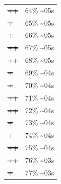 \documentclass[12pt]{article}
\begin{document}
\begin{center}
\begin{tabular}{ll}
\sout{\sout{\sout{\sout{\sout{\sout{\sout{\sout{\sout{\sout{\sout{\sout{\sout{\sout{\sout{++}}}}}}}}}}}}}}} & 64\% \textasciitilde{}05s\\
\sout{\sout{\sout{\sout{\sout{\sout{\sout{\sout{\sout{\sout{\sout{\sout{\sout{\sout{\sout{\sout{+}}}}}}}}}}}}}}}} & 65\% \textasciitilde{}05s\\
\sout{\sout{\sout{\sout{\sout{\sout{\sout{\sout{\sout{\sout{\sout{\sout{\sout{\sout{\sout{\sout{+}}}}}}}}}}}}}}}} & 66\% \textasciitilde{}05s\\
\sout{\sout{\sout{\sout{\sout{\sout{\sout{\sout{\sout{\sout{\sout{\sout{\sout{\sout{\sout{\sout{++}}}}}}}}}}}}}}}} & 67\% \textasciitilde{}05s\\
\sout{\sout{\sout{\sout{\sout{\sout{\sout{\sout{\sout{\sout{\sout{\sout{\sout{\sout{\sout{\sout{++}}}}}}}}}}}}}}}} & 68\% \textasciitilde{}05s\\
\sout{\sout{\sout{\sout{\sout{\sout{\sout{\sout{\sout{\sout{\sout{\sout{\sout{\sout{\sout{\sout{\sout{+}}}}}}}}}}}}}}}}} & 69\% \textasciitilde{}04s\\
\sout{\sout{\sout{\sout{\sout{\sout{\sout{\sout{\sout{\sout{\sout{\sout{\sout{\sout{\sout{\sout{\sout{+}}}}}}}}}}}}}}}}} & 70\% \textasciitilde{}04s\\
\sout{\sout{\sout{\sout{\sout{\sout{\sout{\sout{\sout{\sout{\sout{\sout{\sout{\sout{\sout{\sout{\sout{++}}}}}}}}}}}}}}}}} & 71\% \textasciitilde{}04s\\
\sout{\sout{\sout{\sout{\sout{\sout{\sout{\sout{\sout{\sout{\sout{\sout{\sout{\sout{\sout{\sout{\sout{++}}}}}}}}}}}}}}}}} & 72\% \textasciitilde{}04s\\
\sout{\sout{\sout{\sout{\sout{\sout{\sout{\sout{\sout{\sout{\sout{\sout{\sout{\sout{\sout{\sout{\sout{\sout{+}}}}}}}}}}}}}}}}}} & 73\% \textasciitilde{}04s\\
\sout{\sout{\sout{\sout{\sout{\sout{\sout{\sout{\sout{\sout{\sout{\sout{\sout{\sout{\sout{\sout{\sout{\sout{+}}}}}}}}}}}}}}}}}} & 74\% \textasciitilde{}04s\\
\sout{\sout{\sout{\sout{\sout{\sout{\sout{\sout{\sout{\sout{\sout{\sout{\sout{\sout{\sout{\sout{\sout{\sout{++}}}}}}}}}}}}}}}}}} & 75\% \textasciitilde{}04s\\
\sout{\sout{\sout{\sout{\sout{\sout{\sout{\sout{\sout{\sout{\sout{\sout{\sout{\sout{\sout{\sout{\sout{\sout{++}}}}}}}}}}}}}}}}}} & 76\% \textasciitilde{}03s\\
\sout{\sout{\sout{\sout{\sout{\sout{\sout{\sout{\sout{\sout{\sout{\sout{\sout{\sout{\sout{\sout{\sout{\sout{\sout{+}}}}}}}}}}}}}}}}}}} & 77\% \textasciitilde{}03s\\

\end{tabular}
\end{center}
\end{document}
